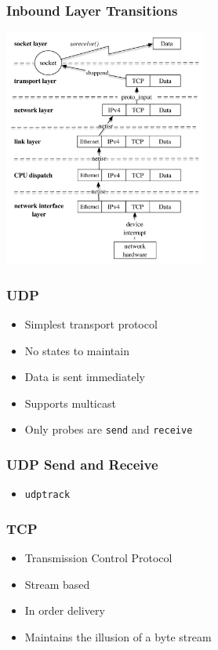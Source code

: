\documentclass[pdftex]{beamer} %
\begin{document}
\begin{frame}
\centering
  \frametitle{Inbound Layer Transitions}
\includegraphics[width=0.5\textwidth]{../figures/inbound}
\end{frame}

\begin{frame}[fragile]
  \frametitle{UDP}
  \begin{itemize}
  \item Simplest transport protocol
  \item No states to maintain
  \item Data is sent immediately
  \item Supports multicast
  \item Only probes are \verb+send+ and \verb+receive+
  \end{itemize}
\end{frame}

\begin{frame}[fragile]
  \frametitle{UDP Send and Receive}
  \begin{itemize}
  \item \verb|udptrack|
  \end{itemize}
\end{frame}

\begin{frame}
  \frametitle{TCP}
  \begin{itemize}
  \item Transmission Control Protocol
  \item Stream based
  \item In order delivery
  \item Maintains the illusion of a byte stream
  \end{itemize}
\end{frame}
\end{document}
